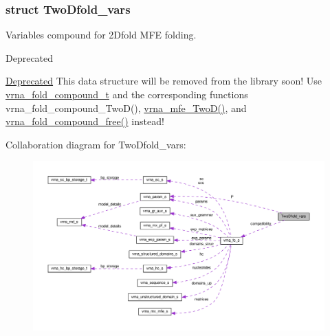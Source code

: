 \subsubsection{struct Two\+Dfold\+\_\+vars}
Variables compound for 2\+Dfold M\+FE folding. 

\begin{DoxyRefDesc}{Deprecated}
\item[\hyperlink{deprecated__deprecated000001}{Deprecated}]This data structure will be removed from the library soon! Use \hyperlink{group__fold__compound_ga1b0cef17fd40466cef5968eaeeff6166}{vrna\+\_\+fold\+\_\+compound\+\_\+t} and the corresponding functions vrna\+\_\+fold\+\_\+compound\+\_\+\+Two\+D(), \hyperlink{group__kl__neighborhood__mfe_ga243c288b463147352829df04de6a2f77}{vrna\+\_\+mfe\+\_\+\+Two\+D()}, and \hyperlink{group__fold__compound_gadded6039d63f5d6509836e20321534ad}{vrna\+\_\+fold\+\_\+compound\+\_\+free()} instead! \end{DoxyRefDesc}


Collaboration diagram for Two\+Dfold\+\_\+vars\+:
\nopagebreak
\begin{figure}[H]
\begin{center}
\leavevmode
\includegraphics[width=350pt]{structTwoDfold__vars__coll__graph}
\end{center}
\end{figure}
